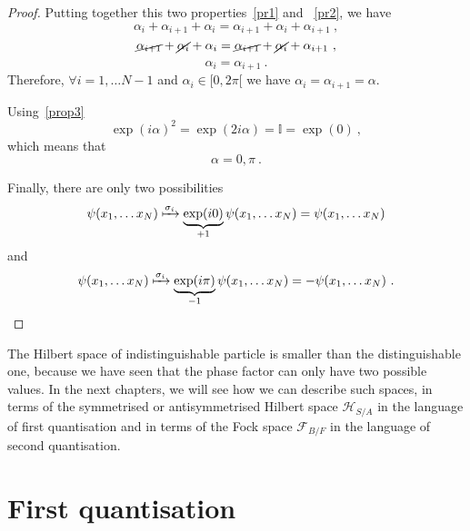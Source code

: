 \begin{proof}
        Putting together this two properties~\eqref{pr1} and ~\eqref{pr2}, we have
        \begin{equation*}
            \alpha_i + \alpha_{i+1} + \alpha_i = \alpha_{i+1} + \alpha_i + \alpha_{i+1} ~,
        \end{equation*}
        \begin{equation*}
            \cancel{\alpha_{i+1}} + \cancel{\alpha_i }+ \alpha_i = \cancel{\alpha_{i+1}} + \cancel{\alpha_i} + \alpha_{i+1} ~,
        \end{equation*}
        \begin{equation*}
            \alpha_i = \alpha_{i+1} ~.
        \end{equation*}
        Therefore, $\forall i= 1, \ldots N-1$ and $\alpha_i \in [0, 2\pi[$ we have $\alpha_i = \alpha_{i+1} = \alpha$.

        Using~\eqref{prop3}
        \begin{equation*}
            \exp(i \alpha)^2 = \exp (2 i \alpha) = \mathbb I = \exp(0) ~,
        \end{equation*}
        which means that 
        \begin{equation*}
            \alpha = 0, \pi ~.
        \end{equation*}

        Finally, there are only two possibilities 
        \begin{equation*}
            \psi(x_1, \ldots x_N) \xmapsto{\sigma_i} \underbrace{\exp(i 0)}_{+1} \psi(x_1, \ldots x_N) = \psi(x_1, \ldots x_N)
        \end{equation*}
        and 
        \begin{equation*}
            \psi(x_1, \ldots x_N) \xmapsto{\sigma_i} \underbrace{\exp(i \pi)}_{-1} \psi(x_1, \ldots x_N) = - \psi(x_1, \ldots x_N)~.
        \end{equation*}
    \end{proof}

    The Hilbert space of indistinguishable particle is smaller than the distinguishable one, because we have seen that the phase factor can only have two possible values. In the next chapters, we will see how we can describe such spaces, in terms of the symmetrised or antisymmetrised Hilbert space $\mathcal H_{S/A}$ in the language of first quantisation and in terms of the Fock space $\mathcal F_{B/F}$ in the language of second quantisation.

\chapter{First quantisation}

